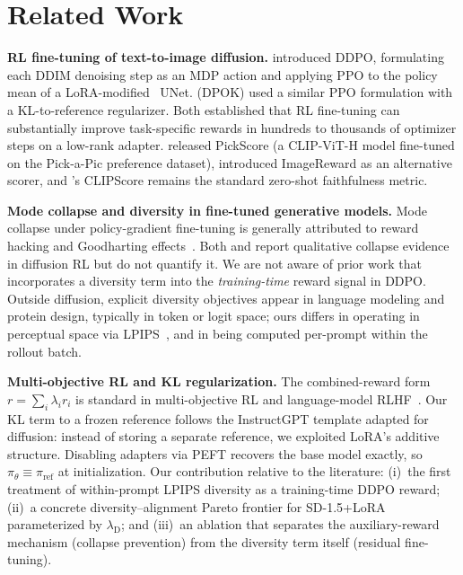 \documentclass[10pt,letterpaper]{article}
\newcommand{\paragraphhead}[1]{\vspace{0.4ex}\noindent\textbf{#1}\hspace{0.5em}}
\newcommand{\lambdaD}{\lambda_{\mathrm{D}}}
\begin{document}
\section{Related Work}
\label{sec:related}

\paragraphhead{RL fine-tuning of text-to-image diffusion.}
\citet{Black23} introduced DDPO, formulating each DDIM denoising step as an MDP action and applying PPO to the policy mean of a LoRA-modified~\citep{Hu22} UNet. \citet{Fan23} (DPOK) used a similar PPO formulation with a KL-to-reference regularizer. Both established that RL fine-tuning can substantially improve task-specific rewards in hundreds to thousands of optimizer steps on a low-rank adapter. \citet{Kirstain23} released PickScore (a CLIP-ViT-H model fine-tuned on the Pick-a-Pic preference dataset), \citet{Xu23} introduced ImageReward as an alternative scorer, and \citet{Hessel21}'s CLIPScore remains the standard zero-shot faithfulness metric.

\paragraphhead{Mode collapse and diversity in fine-tuned generative models.}
Mode collapse under policy-gradient fine-tuning is generally attributed to reward hacking and Goodharting effects~\citep{Skalse22}. Both \citet{Black23} and \citet{Fan23} report qualitative collapse evidence in diffusion RL but do not quantify it. We are not aware of prior work that incorporates a diversity term into the \emph{training-time} reward signal in DDPO. Outside diffusion, explicit diversity objectives appear in language modeling and protein design, typically in token or logit space; ours differs in operating in perceptual space via LPIPS~\citep{Zhang18}, and in being computed per-prompt within the rollout batch.

\paragraphhead{Multi-objective RL and KL regularization.}
The combined-reward form $r = \sum_i \lambda_i r_i$ is standard in multi-objective RL and language-model RLHF~\citep{Ouyang22}. Our KL term to a frozen reference follows the InstructGPT template adapted for diffusion: instead of storing a separate reference, we exploited LoRA's additive structure. Disabling adapters via PEFT recovers the base model exactly, so $\pi_\theta \equiv \pi_{\mathrm{ref}}$ at initialization. Our contribution relative to the literature: (i)~the first treatment of within-prompt LPIPS diversity as a training-time DDPO reward; (ii)~a concrete diversity--alignment Pareto frontier for SD-1.5+LoRA parameterized by $\lambdaD$; and (iii)~an ablation that separates the auxiliary-reward mechanism (collapse prevention) from the diversity term itself (residual fine-tuning).
\end{document}
